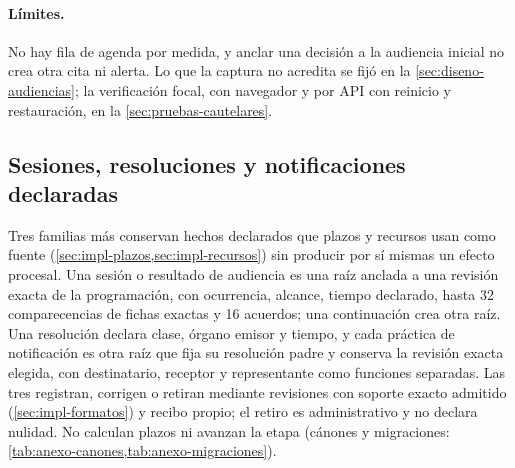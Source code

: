 \paragraph{Límites.} No hay fila de agenda por medida, y anclar una decisión a la audiencia inicial no crea otra cita ni alerta. Lo que la captura no acredita se fijó en la \cref{sec:diseno-audiencias}; la verificación focal, con navegador y por API con reinicio y restauración, en la \cref{sec:pruebas-cautelares}.


\subsection{Sesiones, resoluciones y notificaciones declaradas}\label{sec:impl-resoluciones}

Tres familias más conservan hechos declarados que plazos y recursos usan como fuente (\cref{sec:impl-plazos,sec:impl-recursos}) sin producir por sí mismas un efecto procesal. Una sesión o resultado de audiencia es una raíz anclada a una revisión exacta de la programación, con ocurrencia, alcance, tiempo declarado, hasta 32 comparecencias de fichas exactas y 16 acuerdos; una continuación crea otra raíz. Una resolución declara clase, órgano emisor y tiempo, y cada práctica de notificación es otra raíz que fija su resolución padre y conserva la revisión exacta elegida, con destinatario, receptor y representante como funciones separadas. Las tres registran, corrigen o retiran mediante revisiones con soporte exacto admitido (\cref{sec:impl-formatos}) y recibo propio; el retiro es administrativo y no declara nulidad. No calculan plazos ni avanzan la etapa (cánones y migraciones: \cref{tab:anexo-canones,tab:anexo-migraciones}).

